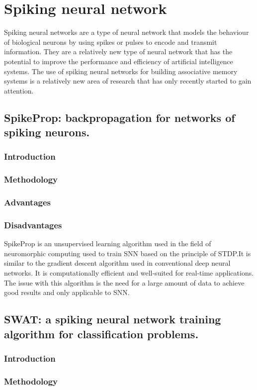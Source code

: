 \section{Spiking neural network}
Spiking neural networks are a type of neural network that models the behaviour
of biological neurons by using spikes or pulses to encode and transmit
information. They are a relatively new type of neural network that has the
potential to improve the performance and efficiency of artificial intelligence
systems. The use of spiking neural networks for building associative memory
systems is a relatively new area of research that has only recently started to
gain attention.
\subsection{SpikeProp: backpropagation for networks of spiking neurons.}
\subsubsection{Introduction}
\subsubsection{Methodology}
\subsubsection{Advantages}
\subsubsection{Disadvantages}
SpikeProp\cite{spikeprop} is an unsupervised learning algorithm used in the
field of neuromorphic computing used to train SNN based on the principle of
STDP.\@ It is similar to the gradient descent algorithm used in conventional
deep neural networks. It is computationally efficient and well-suited for
real-time applications. The issue with this algorithm is the need for a large
amount of data to achieve good results and only applicable to SNN.\@

\subsection{SWAT: a spiking neural network training algorithm for classification problems.}
\subsubsection{Introduction}
\subsubsection{Methodology}
